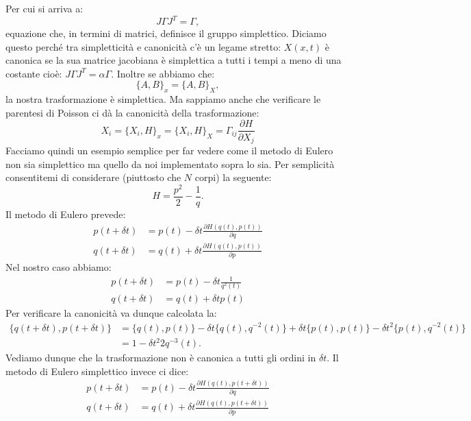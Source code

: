 \documentclass[10pt,a4paper]{article}
\begin{document}
Per cui si arriva a:
\begin{equation}
J \Gamma J^T = \Gamma,
\end{equation}
equazione che, in termini di matrici, definisce il gruppo simplettico.
Diciamo questo perché tra simpletticità e canonicità c'è un legame stretto: $X(x, t)$ è canonica se la sua matrice jacobiana è simplettica a tutti i tempi a meno di una costante cioè: $J \Gamma J^T = \alpha \Gamma$. Inoltre se abbiamo che:
\begin{equation}
\{A, B\}_x = \{A, B\}_X,
\end{equation}
la nostra trasformazione è simplettica. Ma sappiamo anche che verificare le parentesi di Poisson ci dà la canonicità della trasformazione:
\begin{equation}
X_i = \{X_i, H\}_x = \{X_i, H\}_X = \Gamma_{ij} \frac{\partial H}{\partial X_j}
\end{equation}
Facciamo quindi un esempio semplice per far vedere come il metodo di Eulero non sia simplettico ma quello da noi implementato sopra lo sia. Per semplicità consentitemi di considerare (piuttosto che $N$ corpi) la seguente:
\begin{equation}
H = \frac{p^2}{2} - \frac{1}{q}.
\end{equation} 
Il metodo di Eulero prevede:
\begin{align}
p(t+ \delta t)&=p(t) - \delta t \frac{\partial H(q(t), p(t))}{\partial q}\\
q(t+ \delta t)&=q(t) + \delta t \frac{\partial H(q(t), p(t))}{\partial p}
\end{align}
Nel nostro caso abbiamo:
\begin{align}
p(t+ \delta t)&=p(t) - \delta t \frac{1}{q^2(t)}\\
q(t+ \delta t)&=q(t) + \delta t p(t)
\end{align}
Per verificare la canonicità va dunque calcolata la:
\begin{equation}
\begin{split}
\{q(t+ \delta t), p(t+ \delta t)\} &= \{q(t), p(t)\} - \delta t \{q(t), q^{-2}(t)\} + \delta t \{p(t), p(t)\} - \delta t^2 \{p(t), q^{-2}(t) \} \\
 &= 1 - \delta t^2 2 q^{-3}(t) .
\end{split} 
\end{equation}
Vediamo dunque che la trasformazione non è canonica a tutti gli ordini in $\delta t$. Il metodo di Eulero simplettico invece ci dice:
\begin{align}
p(t+ \delta t)&=p(t) - \delta t \frac{\partial H(q(t), p(t+ \delta t))}{\partial q}\\
q(t+ \delta t)&=q(t) + \delta t \frac{\partial H(q(t), p(t+ \delta t))}{\partial p}
\end{align}
\end{document}
